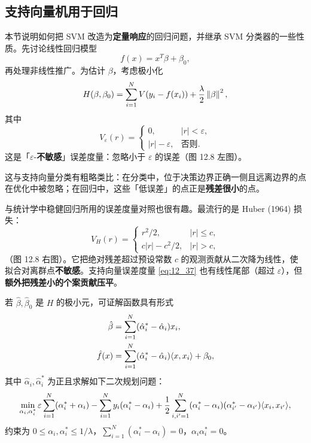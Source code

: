 \subsection{支持向量机用于回归}

本节说明如何把 SVM 改造为\textbf{定量响应}的回归问题，并继承 SVM 分类器的一些性质。先讨论线性回归模型
\begin{equation}
f(x) = x^T\beta + \beta_0, \label{eq:12_35}
\end{equation}
再处理非线性推广。为估计 $\beta$，考虑极小化
\begin{equation}
H(\beta,\beta_0) = \sum_{i=1}^{N}V(y_i - f(x_i)) + \frac{\lambda}{2}\left\lVert\beta\right\rVert^2, \label{eq:12_36}
\end{equation}
其中
\begin{equation}
V_\varepsilon(r) = \begin{cases} 0, & |r| < \varepsilon, \\ |r| - \varepsilon, & \text{否则}. \end{cases} \label{eq:12_37}
\end{equation}
这是「$\varepsilon$-\textbf{不敏感}」误差度量：忽略小于 $\varepsilon$ 的误差（图 12.8 左图）。

\begin{remark}[与分类情形的类比]
这与支持向量分类有粗略类比：在分类中，位于决策边界正确一侧且远离边界的点在优化中被忽略；在回归中，这些「低误差」的点正是\textbf{残差很小}的点。

与统计学中稳健回归所用的误差度量对照也很有趣。最流行的是 Huber (1964) 损失：
\begin{equation}
V_H(r) = \begin{cases} r^2/2, & |r|\le c, \\ c|r| - c^2/2, & |r| > c, \end{cases} \label{eq:12_38}
\end{equation}
（图 12.8 右图）。它把绝对残差超过预设常数 $c$ 的观测贡献从二次降为线性，使拟合对离群点\textbf{不敏感}。支持向量误差度量 \ref{eq:12_37} 也有线性尾部（超过 $\varepsilon$），但\textbf{额外把残差小的个案贡献压平}。
\end{remark}

若 $\hat\beta,\hat\beta_0$ 是 $H$ 的极小元，可证解函数具有形式
\begin{align}
\hat\beta &= \sum_{i=1}^{N}(\hat\alpha_i^* - \hat\alpha_i)x_i, \label{eq:12_39}\\
\hat f(x) &= \sum_{i=1}^{N}(\hat\alpha_i^* - \hat\alpha_i)\langle x,x_i\rangle + \beta_0, \label{eq:12_40}
\end{align}
其中 $\hat\alpha_i,\hat\alpha_i^*$ 为正且求解如下二次规划问题：
\begin{equation}
\min_{\alpha_i,\alpha_i^*} \varepsilon\sum_{i=1}^{N}(\alpha_i^* + \alpha_i) - \sum_{i=1}^{N}y_i(\alpha_i^* - \alpha_i) + \frac12\sum_{i,i'=1}^{N}(\alpha_i^* - \alpha_i)(\alpha_{i'}^* - \alpha_{i'})\langle x_i,x_{i'}\rangle, \label{eq:12_41}
\end{equation}
约束为 $0\le \alpha_i,\alpha_i^*\le 1/\lambda$，$\sum_{i=1}^{N}(\alpha_i^* - \alpha_i)=0$，$\alpha_i\alpha_i^*=0$。

